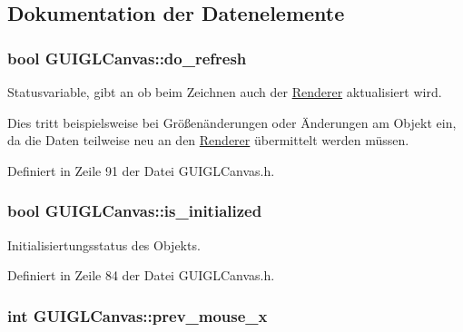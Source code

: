 \subsection{Dokumentation der Datenelemente}
\hypertarget{classGUIGLCanvas_a7139f37aa028f71e393a0c479299455d}{
\subsubsection[{do\-\_\-refresh}]{\setlength{\rightskip}{0pt plus 5cm}bool G\-U\-I\-G\-L\-Canvas\-::do\-\_\-refresh\hspace{0.3cm}{\ttfamily [private]}}}\label{classGUIGLCanvas_a7139f37aa028f71e393a0c479299455d}


Statusvariable, gibt an ob beim Zeichnen auch der \hyperlink{classRenderer}{Renderer} aktualisiert wird. 

Dies tritt beispielsweise bei Größenänderungen oder Änderungen am Objekt ein, da die Daten teilweise neu an den \hyperlink{classRenderer}{Renderer} übermittelt werden müssen. 

Definiert in Zeile 91 der Datei G\-U\-I\-G\-L\-Canvas.\-h.

\hypertarget{classGUIGLCanvas_a59e01564652765dec69e7097c10b4455}{
\subsubsection[{is\-\_\-initialized}]{\setlength{\rightskip}{0pt plus 5cm}bool G\-U\-I\-G\-L\-Canvas\-::is\-\_\-initialized\hspace{0.3cm}{\ttfamily [private]}}}\label{classGUIGLCanvas_a59e01564652765dec69e7097c10b4455}


Initialisiertungsstatus des Objekts. 



Definiert in Zeile 84 der Datei G\-U\-I\-G\-L\-Canvas.\-h.

\hypertarget{classGUIGLCanvas_afc22c47a62b8d5b165a22d059816ee22}{
\subsubsection[{prev\-\_\-mouse\-\_\-x}]{\setlength{\rightskip}{0pt plus 5cm}int G\-U\-I\-G\-L\-Canvas\-::prev\-\_\-mouse\-\_\-x\hspace{0.3cm}{\ttfamily [private]}}}\label{classGUIGLCanvas_afc22c47a62b8d5b165a22d059816ee22}



